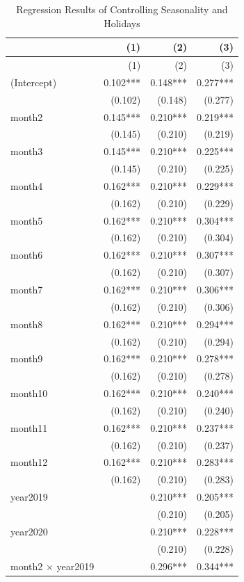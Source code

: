 \documentclass[AEJ]{AEA}
\begin{document}
{\small
\begin{longtable}[]{@{}lrrr@{}}
\caption{Regression Results of Controlling Seasonality and
Holidays}\tabularnewline
\toprule\noalign{}
& (1) & (2) & (3) \\
\midrule\noalign{}
\endfirsthead
\toprule\noalign{}
& (1) & (2) & (3) \\
\midrule\noalign{}
\endhead
\bottomrule\noalign{}
\endlastfoot
(Intercept) & 0.102*** & 0.148*** & 0.277*** \\
& (0.102) & (0.148) & (0.277) \\
month2 & 0.145*** & 0.210*** & 0.219*** \\
& (0.145) & (0.210) & (0.219) \\
month3 & 0.145*** & 0.210*** & 0.225*** \\
& (0.145) & (0.210) & (0.225) \\
month4 & 0.162*** & 0.210*** & 0.229*** \\
& (0.162) & (0.210) & (0.229) \\
month5 & 0.162*** & 0.210*** & 0.304*** \\
& (0.162) & (0.210) & (0.304) \\
month6 & 0.162*** & 0.210*** & 0.307*** \\
& (0.162) & (0.210) & (0.307) \\
month7 & 0.162*** & 0.210*** & 0.306*** \\
& (0.162) & (0.210) & (0.306) \\
month8 & 0.162*** & 0.210*** & 0.294*** \\
& (0.162) & (0.210) & (0.294) \\
month9 & 0.162*** & 0.210*** & 0.278*** \\
& (0.162) & (0.210) & (0.278) \\
month10 & 0.162*** & 0.210*** & 0.240*** \\
& (0.162) & (0.210) & (0.240) \\
month11 & 0.162*** & 0.210*** & 0.237*** \\
& (0.162) & (0.210) & (0.237) \\
month12 & 0.162*** & 0.210*** & 0.283*** \\
& (0.162) & (0.210) & (0.283) \\
year2019 & & 0.210*** & 0.205*** \\
& & (0.210) & (0.205) \\
year2020 & & 0.210*** & 0.228*** \\
& & (0.210) & (0.228) \\
month2 × year2019 & & 0.296*** & 0.344*** \\

\end{longtable}}
\end{document}
